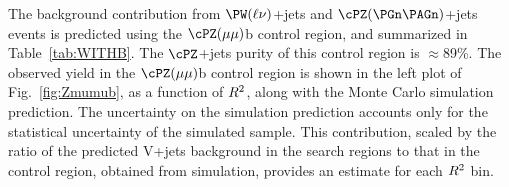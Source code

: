The background contribution from $\PW(\ell \nu)$+jets and $\cPZ(\PGn\PAGn)$+jets events is 
predicted using the $\cPZ(\mu\mu)$b control region, and summarized in Table~\ref{tab:WITHB}.
The $\cPZ$+jets purity of this control region is ${\approx}$89\%. 
The observed yield in the $\cPZ(\mu\mu)$b control region is shown in the left plot of Fig.~\ref{fig:Zmumub}, 
as a function of $R^2$, along with the Monte Carlo simulation prediction. The uncertainty on the
simulation prediction accounts only for the statistical uncertainty of the simulated sample.
This contribution, scaled by the ratio of the predicted V+jets background in the search regions 
to that in the control region, obtained from simulation, provides an estimate for each $R^2$ bin. 

\begin{table}
\centering
{}
\end{table}
